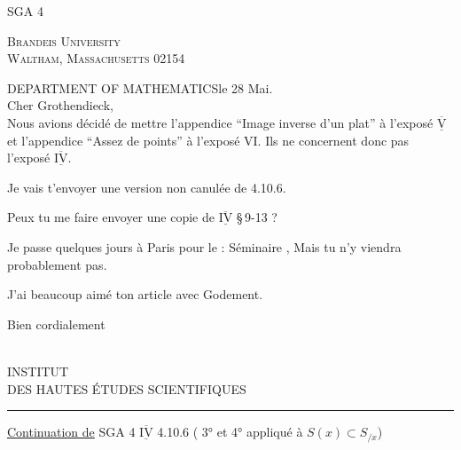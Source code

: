 \begin{flushright}
SGA 4
\end{flushright}

\begin{center}
\textsc{Brandeis University}\\
\textsc{Waltham, Massachusetts 02154}
\end{center}
\noindent DEPARTMENT OF MATHEMATICS\hfill le 28 Mai.\\

Cher Grothendieck,\\

Nous avions décidé de mettre l'appendice ``Image inverse d'un plat'' à l'exposé $\underline{\overline{\mathrm{V}}}$ et l'appendice ``Assez de points'' à l'exposé VI. Ils ne concernent donc pas l'exposé $\underline{\overline{\mathrm{IV}}}$.

Je vais t'envoyer une version non canulée de 4.10.6.

Peux tu me faire envoyer une copie de $\underline{\overline{\mathrm{IV}}}$ \S\,9-13 ?

Je passe quelques jours à Paris pour le :  Séminaire , Mais tu n'y viendra probablement pas.

J'ai beaucoup aimé ton article avec Godement.

\begin{flushright}
Bien cordialement\\
\\
\end{flushright}

\begin{center}
INSTITUT\\
DES HAUTES ÉTUDES SCIENTIFIQUES\\
\rule{2.3em}{0.4pt}
\end{center}

\uline{Continuation de} SGA 4 $\underline{\overline{\mathrm{IV}}}$ 4.10.6 ( 3° et 4°\unsure{)} appliqué à $S(x)\subset S_{/x}$)

